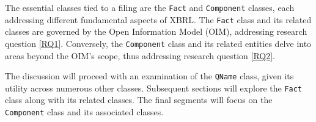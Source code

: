 The essential classes tied to a filing are the \texttt{Fact} and \texttt{Component} classes, each addressing different fundamental aspects of XBRL.
The \texttt{Fact} class and its related classes are governed by the Open Information Model (OIM)\cite{oim}, addressing research question \ref{RQ1}.
Conversely, the \texttt{Component} class and its related entities delve into areas beyond the OIM's scope, thus addressing research question \ref{RQ2}.

The discussion will proceed with an examination of the \texttt{QName} class, given its utility across numerous other classes.
Subsequent sections will explore the \texttt{Fact} class along with its related classes.
The final segments will focus on the \texttt{Component} class and its associated classes.




